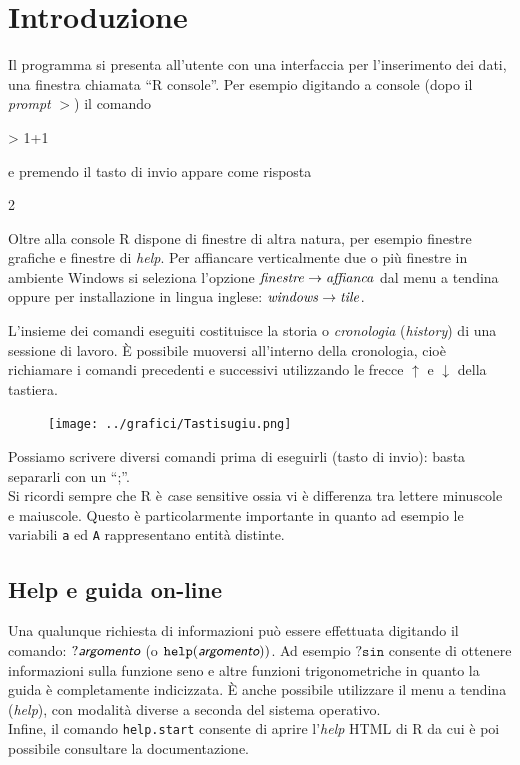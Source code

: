 \documentclass[onecolumn,11pt]{book}
\newcommand{\varia}[1]{\textsl{\textsf{#1}}}
\begin{document}
\section{Introduzione}
Il programma si presenta all'utente con una interfaccia per l'inserimento dei dati, una finestra chiamata ``\textsf{R} console''. Per esempio digitando a console (dopo il \textit{prompt} $>$) il comando
\begin{Schunk}
\begin{Sinput}
> 1+1
\end{Sinput}
\end{Schunk}
e premendo il tasto di invio appare come risposta
\begin{Schunk}
\begin{Soutput}
[1] 2
\end{Soutput}
\end{Schunk}
Oltre alla console
\textsf{R} dispone di finestre di altra natura, per esempio finestre grafiche e finestre di {\it help}. Per affiancare verticalmente due o pi\`u finestre in ambiente {\textsf Windows} si seleziona l'opzione ${\it finestre} \rightarrow {\it affianca}$ dal menu a tendina
oppure per installazione in lingua inglese:  ${\it windows} \rightarrow{\it  tile}$. 
 
L'insieme dei comandi eseguiti costituisce la storia o \textit{cronologia} (\textit{history}) 
 di una sessione di lavoro. \`E possibile muoversi all'interno della cronologia, cio\`e richiamare i comandi precedenti e successivi utilizzando le frecce $\uparrow$ e $\downarrow$ della tastiera.\\
\begin{figure}
     \texttt{[image: ../grafici/Tastisugiu.png]}
 \vspace{-20pt}  
\end{figure}Possiamo scrivere diversi comandi prima di eseguirli (tasto di invio): basta separarli con un  ``;''.\\
Si ricordi sempre che \textsf{R} \`e {\emph case sensitive} ossia vi \`e differenza tra lettere minuscole e maiuscole.  Questo \`e particolarmente importante in quanto ad esempio le variabili \texttt{a} ed \texttt{A} rappresentano entit\`a distinte.

 \subsection*{Help e guida on-line}
Una qualunque richiesta di informazioni pu\`o essere effettuata digitando il comando:
$?\varia{argomento}$   (o $\texttt{help}(\varia{argomento}))$.
Ad esempio $?\texttt{sin}$  consente di ottenere informazioni sulla funzione seno e altre funzioni trigonometriche in quanto la guida \`e completamente indicizzata. \`E anche possibile utilizzare il menu a tendina ({\it help}), con modalit\`a diverse a seconda del sistema operativo.\\
Infine, il comando \texttt{help.start} consente di aprire l'\textit{help} HTML di \textsf{R} da cui \`e poi possibile consultare la documentazione.
\end{document}
